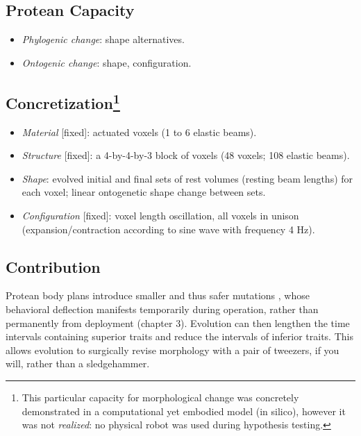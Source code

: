 \subsection{Protean Capacity}

\begin{itemize}
    \item \textit{Phylogenic change}: shape alternatives.
    \item \textit{Ontogenic change}: shape, configuration.
\end{itemize}


\subsection[Concretization]{Concretization\footnote{This particular capacity for morphological change was concretely demonstrated in a computational yet embodied model (in silico), however it was not \textit{realized}: no physical robot was used during hypothesis testing.}}

\begin{itemize}
    \item \textit{Material} [fixed]: actuated voxels (1 to 6 elastic beams).
    \item \textit{Structure} [fixed]: a 4-by-4-by-3 block of voxels (48 voxels; 108 elastic beams).
    \item \textit{Shape}: evolved initial and final sets of rest volumes (resting beam lengths) for each voxel; linear ontogenetic shape change between sets.
    \item \textit{Configuration} [fixed]: voxel length oscillation, all voxels in unison (expansion/contraction according to sine wave with frequency 4 Hz).
\end{itemize}


\subsection{Contribution}


Protean body plans introduce smaller and thus safer mutations \cite{lehman2018safe}, whose behavioral deflection manifests temporarily during operation, rather than permanently from deployment (chapter 3).
Evolution can then lengthen the time intervals containing superior traits and reduce the intervals of inferior traits.
This allows evolution to surgically revise morphology with a pair of tweezers, if you will, rather than a sledgehammer.







